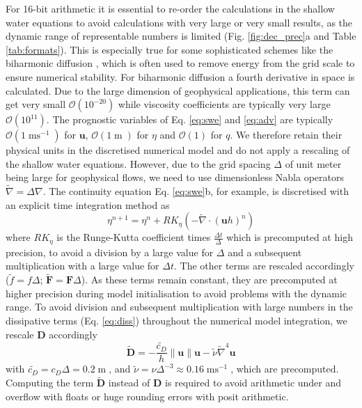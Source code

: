 \documentclass[draft]{agujournal2019}
\newcommand{\op}{\operatorname}
\begin{document}
For 16-bit arithmetic it is essential to re-order the calculations in the shallow water equations to avoid calculations with very large or very small results, as the dynamic range of representable numbers is limited (Fig. \ref{fig:dec_prec}a and Table \ref{tab:formats}). This is especially true for some sophisticated schemes like the biharmonic diffusion \cite{Griffies2000}, which is often used to remove energy from the grid scale to ensure numerical stability. For biharmonic diffusion a fourth derivative in space is calculated. Due to the large dimension of geophysical applications, this term can get very small $\mathcal{O}(10^{-20})$ while viscosity coefficients are typically very large $\mathcal{O}(10^{11})$. The prognostic variables of Eq. \ref{eq:swe} and \ref{eq:adv} are typically $\mathcal{O}(1\op{ms}^{-1})$ for $\mathbf{u}$, $\mathcal{O}(1\op{m})$ for $\eta$ and $\mathcal{O}(1)$ for $q$. We therefore retain their physical units in the discretised numerical model and do not apply a rescaling of the shallow water equations. However, due to the grid spacing $\Delta$ of unit meter being large for geophysical flows, we need to use dimensionless Nabla operators $\tilde{\nabla} = \Delta\nabla$. The continuity equation Eq. \ref{eq:swe}b, for example, is discretised with an explicit time integration method as
\begin{equation}
\eta^{n+1} = \eta^n + RK_{\eta}\left( - \tilde{\nabla} \cdot (\mathbf{u}h)^n\right)
\label{eq:discr}
\end{equation}
where $RK_\eta$ is the Runge-Kutta coefficient times $\tfrac{\Delta t}{\Delta}$ which is precomputed at high precision, to avoid a division by a large value for $\Delta$ and a subsequent multiplication with a large value for $\Delta t$. The other terms are rescaled accordingly ($\tilde{f} = f\Delta$; $\tilde{\mathbf{F}} = \mathbf{F}\Delta$). As these terms remain constant, they are precomputed at higher precision during model initialisation to avoid problems with the dynamic range. To avoid division and subsequent multiplication with large numbers in the dissipative terms (Eq. \ref{eq:diss}) throughout the numerical model integration, we rescale $\mathbf{D}$  accordingly
\begin{equation}
\tilde{\mathbf{D}} =-\frac{\tilde{c_D}}{h}\| \mathbf{u} \| \mathbf{u} - \tilde{\nu}\tilde{\nabla}^4\mathbf{u}
\end{equation}
with $\tilde{c_D} = c_D\Delta = 0.2\op{m}$,  and $\tilde{\nu} = \nu\Delta^{-3} \approx 0.16\op{ms}^{-1}$, which are precomputed. Computing the term $\tilde{\mathbf{D}}$ instead of $\mathbf{D}$ is required to avoid arithmetic under and overflow with floats or huge rounding errors with posit arithmetic.
\end{document}
